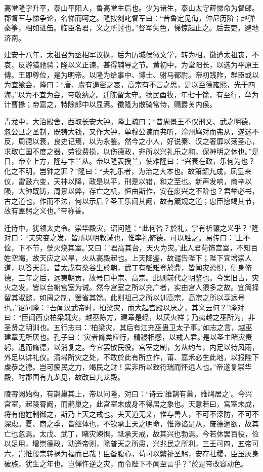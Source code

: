 \documentclass[12pt,UTF8]{ctexbook}
\begin{document}
高堂隆字升平，泰山平阳人，鲁高堂生后也。少为诸生，泰山太守薛悌命为督邮。郡督军与悌争论，名悌而呵之。隆按剑叱督军曰：“昔鲁定见侮，仲尼历阶；赵弹秦筝，相如进缶。临臣名君，义之所讨也。”督军失色，悌惊起止之。后去吏，避地济南。

建安十八年，太祖召为丞相军议掾，后为历城侯徽文学，转为相。徽遭太祖丧，不哀，反游猎驰骋；隆以义正谏，甚得辅导之节。黄初中，为堂阳长，以选为平原王傅。王即尊位，是为明帝。以隆为给事中、博士、驸马都尉。帝初践阼，群臣或以为宜飨会，隆曰：“唐、虞有遏密之哀，高宗有不言之思，是以至德雍熙，光于四海。”以为不宜为会，帝敬纳之。迁陈留太守。犊民酉牧，年七十馀，有至行，举为计曹掾；帝嘉之，特除郎中以显焉。徵隆为散骑常侍，赐爵关内侯。

青龙中，大治殿舍，西取长安大钟。隆上疏曰；“昔周景王不仪刑文、武之明德，忽公旦之圣制，既铸大钱，又作大钟，单穆公谏而弗听，泠州鸠对而弗从，遂迷不反，周德以衰，良史记焉，以为永鉴。然今之小人，好说秦、汉之奢靡以荡圣心，求取亡国不度之器，劳役费损，以伤德政，非所以兴礼乐之和，保神明之休也。”是日，帝幸上方，隆与卞兰从。帝以隆表授兰，使难隆曰：“兴衰在政，乐何为也？化之不明，岂钟之罪？”隆曰：“夫礼乐者，为治之大本也。故箫韶九成，凤皇来仪，雷鼓六变，天神以降，政是以平，刑是以错，和之至也。新声发响，商辛以陨，大钟既铸，周景以弊，存亡之机，恒由斯作，安在废兴之不阶也？君举必书，古之道也，作而不法，何以示后？圣王乐闻其阙，故有箴规之道；忠臣愿竭其节，故有匪躬之义也。”帝称善。

迁侍中，犹领太史令。崇华殿灾，诏问隆：“此何咎？於礼，宁有祈禳之义乎？”隆对曰：“夫灾变之发，皆所以明教诫也，惟率礼脩德，可以胜之。易传曰：'上不俭，下不节，孽火烧其室。'又曰：'君高其台，天火为灾。'此人君苟饰宫室，不知百姓空竭，故天应之以旱，火从高殿起也。上天降鉴，故谴告陛下；陛下宜增崇人道，以答天意。昔太戊有桑谷生於朝，武丁有雊雉登於鼎，皆闻灾恐惧，侧身脩德，三年之后，远夷朝贡，故号曰中宗、高宗。此则前代之明鉴也。今案旧占，灾火之发，皆以台榭宫室为诫。然今宫室之所以充广者，实由宫人猥多之故。宜简择留其淑懿，如周之制，罢省其馀。此则祖己之所以训高宗，高宗之所以享远号也。”诏问隆：“吾闻汉武帝时，柏梁灾，而大起宫殿以厌之，其义云何？”隆对曰：“臣闻西京柏梁既灾，越巫陈方，建章是经，以厌火祥；乃夷越之巫所为，非圣贤之明训也。五行志曰：'柏梁灾，其后有江充巫蛊卫太子事。'如志之言，越巫建章无所厌也。孔子曰：'灾者脩类应行，精祲相感，以戒人君。'是以圣主睹灾责躬，退而脩德，以消复之。今宜罢散民役。宫室之制，务从约节，内足以待风雨，外足以讲礼仪。清埽所灾之处，不敢於此有所立作，莆、嘉禾必生此地，以报陛下虔恭之德。岂可疲民之力，竭民之财！实非所以致符瑞而怀远人也。”帝遂复崇华殿，时郡国有九龙见，故改曰九龙殿。

陵霄阙始构，有鹊巢其上，帝以问隆，对曰：“诗云'维鹊有巢，维鸠居之'。今兴宫室，起陵霄阙，而鹊巢之，此宫室未成身不得居之象也。天意若曰，宫室未成，将有他姓制御之，斯乃上天之戒也。夫天道无亲，惟与善人，不可不深防，不可不深虑。夏、商之季，皆继体也，不钦承上天之明命，惟谗谄是从，废德適欲，故其亡也忽焉。太戊、武丁，睹灾竦惧，祗承天戒，故其兴也勃焉。今若休罢百役，俭以足用，增崇德政，动遵帝则，除普天之所患，兴兆民之所利，三王可四，五帝可六，岂惟殷宗转祸为福而已哉！臣备腹心，苟可以繁祉圣躬，安存社稷，臣虽灰身破族，犹生之年也。岂惮忤逆之灾，而令陛下不闻至言乎？”於是帝改容动色。
\end{document}
